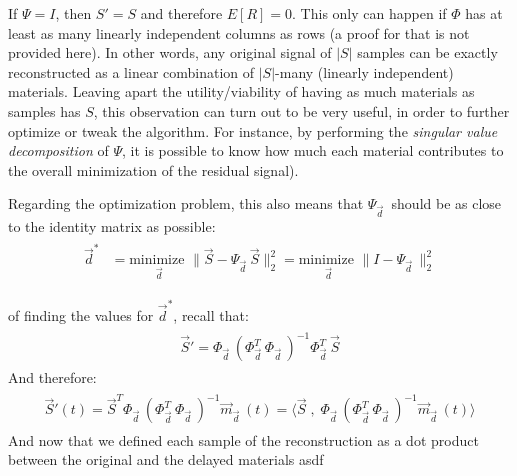 \documentclass[11pt]{scrartcl} %
\begin{document}
  \begin{tcolorbox}
    If \(\Psi=I\), then \(S'=S\) and therefore \(E[R]=0\). This only can happen if \(\Phi\) has at least as many linearly independent columns as rows (a proof for that is not provided here). In other words, any original signal of \(|S|\) samples can be exactly reconstructed as a linear combination of \(|S|\)-many (linearly independent) materials. Leaving apart the utility/viability of having as much materials as samples has \(S\), this observation can turn out to be very useful, in order to further optimize or tweak the algorithm. For instance, by performing the {\it singular value decomposition} of \(\Psi\), it is possible to know how much each material contributes to the overall minimization of the residual signal).
  \end{tcolorbox}

  Regarding the optimization problem, this also means that \(\Psi_{\vec{d}\;}\) should be as close to the identity matrix as possible:
  \begin{align*}
    \begin{aligned}
      \vec{d}^* &= \underset{\vec{d}}{\text{minimize }}
    \bigg\lVert \vec{S}- \Psi_{\vec{d}\;} \vec{S} \bigg\rVert_2^2 =
    \underset{\vec{d}}{\text{minimize }}
    \bigg\lVert I- \Psi_{\vec{d}\;} \bigg\rVert_2^2
    \end{aligned}
  \end{align*}



  of finding the values for \(\vec{d}^*\), recall that:
  \begin{align*}
  \begin{aligned}
    \vec{S}' = \Phi_{\vec{d}\;} (\Phi_{\vec{d}\;}^T \Phi_{\vec{d}\;})^{-1} \Phi_{\vec{d}\;}^T\vec{S}
    \end{aligned}
  \end{align*}
  And therefore:
  \begin{align*}
  \begin{aligned}
    \vec{S}'{\scriptstyle (t)} = \vec{S}^T \Phi_{\vec{d}\;} (\Phi_{\vec{d}\;}^T \Phi_{\vec{d}\;})^{-1} \vec{m}_{\vec{d}\;}{\scriptstyle (t)} = \langle \vec{S} \;,\; \Phi_{\vec{d}\;} (\Phi_{\vec{d}\;}^T \Phi_{\vec{d}\;})^{-1} \vec{m}_{\vec{d}\;}{\scriptstyle (t)} \rangle 
    \end{aligned}
  \end{align*}
  And now that we defined each sample of the reconstruction as a dot product between the original and the delayed materials  asdf
\end{document}
